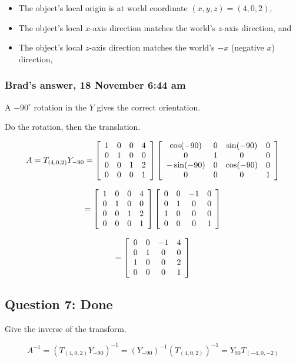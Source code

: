 \documentclass[11pt]{article}
\begin{document}
\begin{spacing}{1.2}
\begin{itemize}
	\item The object's local origin is at world coordinate $(x,y,z) = (4,0,2)$,
	\item The object's local $x$-axis direction matches the world's $z$-axis direction, and 
	\item The object's local $z$-axis direction matches the world's $-x$ (negative $x$) direction, 
\end{itemize}

\subsubsection{Brad's answer, 18 November 6:44 am}

A $-90^{\circ}$ rotation in the $Y$ gives the correct orientation. 

Do the rotation, then the translation.  

$$A = T_{(4,0,2)} Y_{-90} = 
\left[
\begin{array}{cccc}
	1 & 0 & 0 & 4 \cr
	0 & 1 & 0 & 0 \cr
	0 & 0 & 1 & 2 \cr
	0 & 0 & 0 & 1 \cr
\end{array}
\right]
\left[
	\begin{array}{cccc}
		\cos (-90) & 0 & \sin (-90) & 0 \cr
		0 & 1 & 0 & 0 \cr
		-\sin(-90) & 0 & \cos (-90) & 0 \cr
		0 & 0 & 0 & 1 \cr
	\end{array}
\right]
$$

$$= 
\left[
\begin{array}{cccc}
	1 & 0 & 0 & 4 \cr
	0 & 1 & 0 & 0 \cr
	0 & 0 & 1 & 2 \cr
	0 & 0 & 0 & 1 \cr
\end{array}
\right]
\left[
	\begin{array}{cccc}
		0 & 0 & -1 & 0 \cr
		0 & 1 & 0 & 0 \cr
		1 & 0 & 0 & 0 \cr
		0 & 0 & 0 & 1 \cr
	\end{array}
\right]
$$

$$= 
\left[
	\begin{array}{cccc}
		0 & 0 & -1 & 4 \cr
		0 & 1 & 0 & 0 \cr
		1 & 0 & 0 & 2 \cr
		0 & 0 & 0 & 1 \cr
	\end{array}
\right]
$$

\subsection{Question 7:  Done}

Give the inverse of the transform.  

$$A^{-1}= \left(T_{(4,0,2)} Y_{-90}\right)^{-1} = 
\left( Y_{-90} \right)^{-1}\left( T_{(4,0,2)}\right)^{-1} = 
Y_{90} T_{(-4,0,-2)}
$$


\end{spacing}
\end{document}
